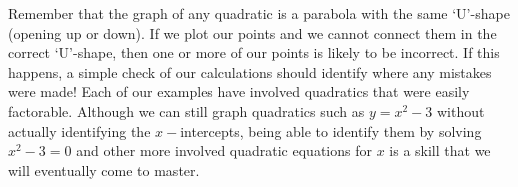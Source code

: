 Remember that the graph of any quadratic is a parabola with the
same `U'-shape (opening up or down).  If we plot our points and we
cannot connect them in the correct `U'-shape, then one or more of our points is likely to be incorrect.  If this happens, a simple check of our calculations should identify where any mistakes were made!  Each of our examples have involved quadratics that were easily factorable.  Although we can still graph quadratics such as $y=x^2-3$ without actually identifying the $x-$intercepts, being able to identify them by solving $x^2-3=0$ and other more involved quadratic equations for $x$ is a skill that we will eventually come to master.




    
    
    
    
    
    
    
    
    
    
    
    
    
    
    
    
    
